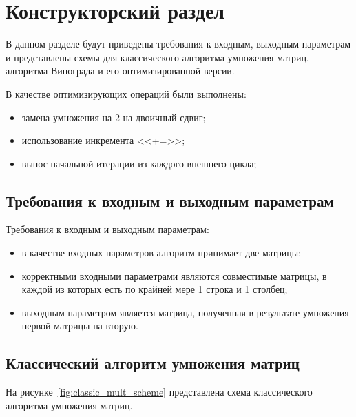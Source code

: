 \chapter{Конструкторский раздел}

В данном разделе будут приведены требования к входным, выходным параметрам и представлены схемы для классического алгоритма умножения матриц, алгоритма Винограда и его оптимизированной версии.

В качестве оптимизирующих операций были выполнены:

\begin{itemize}[label=--]
    \item замена умножения на 2 на двоичный сдвиг;
    \item использование инкремента <<+=>>;
    \item вынос начальной итерации из каждого внешнего цикла;
\end{itemize}

\section{Требования к входным и выходным параметрам}

Требования к входным и выходным параметрам:
\begin{itemize}[label=--]
    \item в качестве входных параметров алгоритм принимает две матрицы;
    \item корректными входными параметрами являются совместимые матрицы, в каждой из которых есть по крайней мере 1 строка и 1 столбец;
    \item выходным параметром является матрица, полученная в результате умножения первой матрицы на вторую.
\end{itemize}

\section{Классический алгоритм умножения матриц}

На рисунке~\ref{fig:classic_mult_scheme} представлена схема классического алгоритма умножения матриц.

